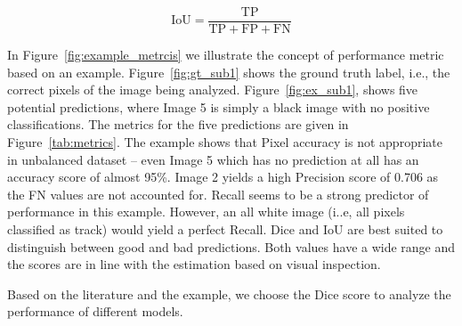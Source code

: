 \documentclass[Master,MDS,english]{BASE/twbook} %
\begin{document}
\[
\text{IoU} = \frac{\text{TP}}{\text{TP} + \text{FP} + \text{FN}}
\]


In Figure~\ref{fig:example_metrcis} we illustrate the concept of performance metric based on an example. Figure~\ref{fig:gt_sub1} shows the ground truth label, i.e., the correct pixels of the image being analyzed. Figure~\ref{fig:ex_sub1}, shows five potential predictions, where Image 5 is simply a black image with no positive classifications. The metrics for the five predictions are given in Figure~\ref{tab:metrics}. The example shows that Pixel accuracy is not appropriate in unbalanced dataset -- even Image 5 which has no prediction at all has an accuracy score of almost 95\%. Image 2 yields a high Precision score of 0.706 as the FN values are not accounted for.  Recall seems to be a strong predictor of performance in this example. However, an all white image (i..e, all pixels classified as track) would yield a perfect Recall. Dice and IoU are best suited to distinguish between good and bad predictions. Both values have a wide range and the scores are in line with the estimation based on visual inspection.

Based on the literature and the example, we choose the Dice score to analyze the performance of different models.
\end{document}
